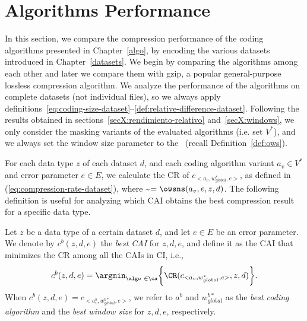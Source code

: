 
\section{Algorithms Performance}
\label{secX:codersmask}


In this section, we compare the compression performance of the coding algorithms presented in Chapter~\ref{algo}, by encoding the various datasets introduced in Chapter~\ref{datasets}. We begin by comparing the algorithms among each other and later we compare them with gzip, a popular general-purpose lossless compression algorithm. We analyze the performance of the algorithms on complete datasets (not individual files), so we always apply definitions~\ref{eq:coding-size-dataset}--\ref{def:relative-difference-dataset}. Following the results obtained in sections~\ref{secX:rendimiento-relativo} and~\ref{secX:windows}, we only consider the masking variants of the evaluated algorithms (i.e. set $V^{*}$), and we always set the window size parameter to the \owsns\ (recall Definition~\ref{def:ows}).


For each data type $z$ of each dataset $d$, and each coding algorithm variant $a_v \in V^{*}$ and error parameter $e \in E$, we calculate the CR of $c_{<a_v, w_{global}^{*}, e>}$, as defined in (\ref{eq:compression-rate-dataset}), where \WGlobal\~$=\owsns(a_v, e, z, d)$. The following definition is useful for analyzing which CAI obtains the best compression result for a specific data type.


\newcommand{\tasaCompTwo}{\CR(c_{<a_v, w_{global}^{*}, e>}, z, d)}
\begin{defcion}
\label{def:bestcai}
Let $z$ be a data type of a certain dataset $d$, and let $e \in E$ be an error parameter. We denote by $c^{b}(z, d, e)$ the \textit{best CAI} for $z, d, e$, and define it as the CAI that minimizes the CR among all the CAIs in CI, i.e.,
\vspace{-3pt}
\begin{equation}
\label{eq:eqbestcai}
c^{b}(z, d, e) = \argmin_{\algo \ \in \ca} \biggl\{ \tasaCompTwo \biggr\}.
\end{equation}
When $c^{b}(z, d, e) = c_{<a^{b}_v, w_{global}^{b*}, e>}$, we refer to $a^{b}$ and $w_{global}^{b*}$ as the \textit{best coding algorithm} and the \textit{best window size} for $z, d, e$, respectively.
\end{defcion}


